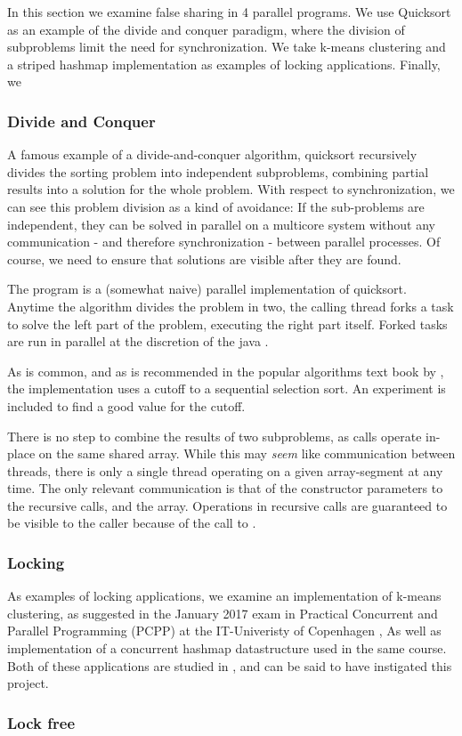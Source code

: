 In this section we examine false sharing in 4  parallel programs. We use Quicksort as an example of the divide and
conquer paradigm, where the division of subproblems limit the need for
synchronization. We take k-means clustering and a striped hashmap implementation
as examples of locking applications. Finally, we 

\subsubsection{Divide and Conquer }
A famous example of a divide-and-conquer algorithm, quicksort recursively
divides the sorting problem into independent subproblems, combining partial
results into a solution for the whole problem. With respect to synchronization,
we can see this problem division as a kind of avoidance: If the sub-problems are
independent, they can be solved in parallel on a multicore system without any
communication - and therefore synchronization - between parallel processes.
Of course, we need to ensure that solutions are visible after they are
found.


The program is a (somewhat naive) parallel implementation of quicksort. Anytime
the algorithm divides the problem in two, the calling thread forks a task to
solve the left part of the problem, executing the right part itself. Forked
tasks are run in parallel at the discretion of the java .

As is common, and as is recommended in the popular algorithms text book by
\citet{sedgewick}, the implementation uses a cutoff to a sequential selection
sort. An experiment is included to find a good value for the cutoff.

There is no step to combine the results of two subproblems, as calls operate
in-place on the same shared array. While this may \textit{seem} like communication
between threads, there is only a single thread operating on a given
array-segment at any time. The only relevant communication is that of the
constructor parameters to the recursive calls, and the array. Operations in
recursive calls are guaranteed to be visible to the caller because of the
call to .


\subsubsection{Locking }
As examples of locking applications, we examine an implementation of k-means
clustering, as suggested in the January 2017 exam in Practical Concurrent and
Parallel Programming (PCPP) at the IT-Univeristy of Copenhagen \cite{kmeansexam,
kmeansexamcode}, As well as implementation of a concurrent hashmap datastructure
used in the same course. Both of these applications are studied in
\cite{mystery}, and can be said to have instigated this project.


\subsubsection{Lock free}

